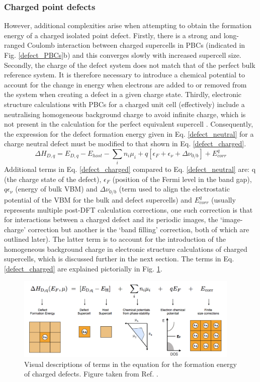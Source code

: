 \documentclass[11pt, twoside]{report}
\begin{document}
\subsubsection{Charged point defects}
However, additional complexities arise when attempting to obtain the formation energy of a charged isolated point defect. Firstly, there is a strong and long-ranged Coulomb interaction between charged supercells in PBCs (indicated in Fig. \ref{defect_PBCs}b) and this converges slowly with increased supercell size.
Secondly, the charge of the defect system does not match that of the perfect bulk reference system. It is therefore necessary to introduce a chemical potential to account for the change in energy when electrons are added to or removed from the system when creating a defect in a given charge state.
Thirdly, electronic structure calculations with PBCs for a charged unit cell (effectively) include a neutralising homogeneous background charge to avoid infinite charge, which is not present in the calculation for the perfect equivalent supercell \cite{freysoldt_rev}. Consequently, the expression for the defect formation energy given in Eq. \ref{defect_neutral} for a charge neutral defect must be modified to that shown in Eq. \ref{defect_charged}.
\begin{equation}\label{defect_charged}
\Delta H_{D,q} = E_{D,q} - E_{host} - \sum_i n_i \mu_i + q[\epsilon_F + \epsilon_{\nu} + \Delta \nu_{0/b}] + E^q_{corr}
\end{equation}
Additional terms in Eq. \ref{defect_charged} compared to Eq. \ref{defect_neutral} are: q (the charge state of the defect), $\epsilon_F$ (position of the Fermi level in the band gap),  $q \epsilon_{\nu}$ (energy of bulk VBM) and $\Delta \nu_{0/b}$ (term used to align the electrostatic potential of the VBM for the bulk and defect supercells) and $E^q_{corr}$ (usually represents multiple post-DFT calculation corrections, one such correction is that for interactions between a charged defect and its periodic images, the `image-charge' correction but another is the `band filling' correction, both of which are outlined later). The latter term is to account for the introduction of the homogeneous background charge in electronic structure calculations of charged supercells, which is discussed further in the next section. The terms in Eq. \ref{defect_charged} are explained pictorially in Fig. \ref{pylada_eq}.
\begin{figure}[h!]
  \centering
    \includegraphics[width=0.95\textwidth]{figures/pylada_eq.png}
    \caption{Visual descriptions of terms in the equation for the formation energy of charged defects. Figure taken from Ref. .}
  \label{pylada_eq}
\end{figure}
\end{document}
